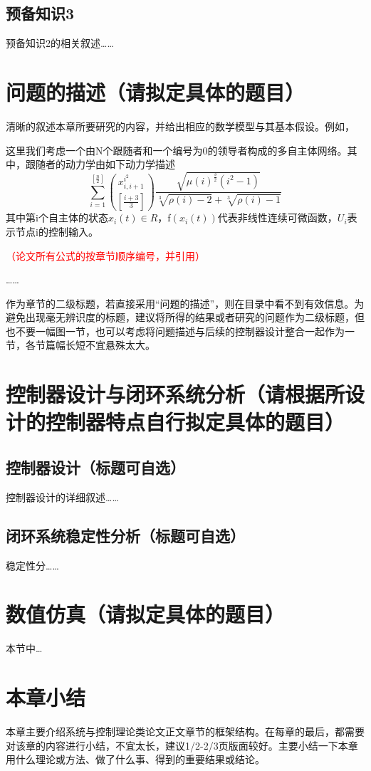 \subsection{预备知识3}
预备知识2的相关叙述……


\section{问题的描述（请拟定具体的题目）}
清晰的叙述本章所要研究的内容，并给出相应的数学模型与其基本假设。例如，

这里我们考虑一个由N个跟随者和一个编号为0的领导者构成的多自主体网络。其中，跟随者的动力学由如下动力学描述
\begin{equation}
\sum_{i=1}^{\left[ \frac{n}{2}\right]} \binom{x_{i,i+1}^{i^2}}
{\left[\frac{i+3}{3} \right]} \frac{\sqrt{\mu(i)^{\frac{3}{2}}
(i^2-1)}} {\sqrt[3]{\rho(i)-2}+\sqrt[3]{\rho(i)-1}}
\end{equation}
其中第i个自主体的状态$x_i (t)\in R$，f$(x_i (t))$代表非线性连续可微函数，$U_i$表示节点i的控制输入。

\textcolor{red}{（论文所有公式的按章节顺序编号，并引用）}

……

作为章节的二级标题，若直接采用“问题的描述”，则在目录中看不到有效信息。为避免出现毫无辨识度的标题，建议将所得的结果或者研究的问题作为二级标题，但也不要一幅图一节，也可以考虑将问题描述与后续的控制器设计整合一起作为一节，各节篇幅长短不宜悬殊太大。

\section{控制器设计与闭环系统分析（请根据所设计的控制器特点自行拟定具体的题目）}

\subsection{控制器设计（标题可自选）}
控制器设计的详细叙述……

\subsection{闭环系统稳定性分析（标题可自选）}
稳定性分……

\section{数值仿真（请拟定具体的题目）}
本节中…

\section{本章小结}
\label{sec:theorem}

本章主要介绍系统与控制理论类论文正文章节的框架结构。在每章的最后，都需要对该章的内容进行小结，不宜太长，建议1/2-2/3页版面较好。主要小结一下本章用什么理论或方法、做了什么事、得到的重要结果或结论。
